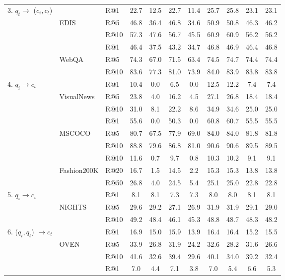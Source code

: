 \begin{table}[]
{\begin{tabular}{lll|cccc|cccc}
 \midrule
\multirow{6}{*}{3. $q_t 	\to$ ($c_i, c_t$)} &  & R@1 & 22.7 & 12.5 & 22.7 & 11.4 & 25.7 & 25.8 & 23.1 & 23.1\\
 & EDIS & R@5 & 46.8 & 36.4 & 46.8 & 34.6 & 50.9 & 50.8 & 46.3 & 46.2\\
 &  & R@10 & 57.3 & 47.6 & 56.7 & 45.5 & 60.9 & 60.9 & 56.2 & 56.2\\
 \cmidrule{2-11}
 &  & R@1 & 46.4 & 37.5 & 43.2 & 34.7 & 46.8 & 46.9 & 46.4 & 46.8\\
 & WebQA & R@5 & 74.3 & 67.0 & 71.5 & 63.4 & 74.5 & 74.7 & 74.4 & 74.4\\
 &  & R@10 & 83.6 & 77.3 & 81.0 & 73.9 & 84.0 & 83.9 & 83.8 & 83.8\\
 \midrule
\multirow{9}{*}{4. $q_i 	\to c_t$} &  & R@1 & 10.4 & 0.0 & 6.5 & 0.0 & 12.5 & 12.2 & 7.4 & 7.4\\
 & VisualNews & R@5 & 23.8 & 4.0 & 16.2 & 4.5 & 27.1 & 26.8 & 18.4 & 18.4\\
 &  & R@10 & 31.0 & 8.1 & 22.2 & 8.6 & 34.9 & 34.6 & 25.0 & 25.0\\
 \cmidrule{2-11}
 &  & R@1 & 55.6 & 0.0 & 50.3 & 0.0 & 60.8 & 60.7 & 55.5 & 55.5\\
 & MSCOCO & R@5 & 80.7 & 67.5 & 77.9 & 69.0 & 84.0 & 84.0 & 81.8 & 81.8\\
 &  & R@10 & 88.8 & 79.6 & 86.8 & 81.0 & 90.6 & 90.6 & 89.5 & 89.5\\
 \cmidrule{2-11}
 &  & R@10 & 11.6 & 0.7 & 9.7 & 0.8 & 10.3 & 10.2 & 9.1 & 9.1\\
 & Fashion200K & R@20 & 16.7 & 1.5 & 14.5 & 2.2 & 15.3 & 15.3 & 13.8 & 13.8\\
 &  & R@50 & 26.8 & 4.0 & 24.5 & 5.4 & 25.1 & 25.0 & 22.8 & 22.8\\
 \midrule
\multirow{3}{*}{5. $q_i 	\to c_i$} &  & R@1 & 8.1 & 8.1 & 7.3 & 7.3 & 8.0 & 8.0 & 8.1 & 8.1\\
 & NIGHTS & R@5 & 29.6 & 29.2 & 27.1 & 26.9 & 31.9 & 31.9 & 29.1 & 29.0\\
 &  & R@10 & 49.2 & 48.4 & 46.1 & 45.3 & 48.8 & 48.7 & 48.3 & 48.2\\
 \midrule
\multirow{6}{*}{6. ($q_i, q_t$) $	\to c_t$} &  & R@1 & 16.9 & 15.0 & 15.9 & 13.9 & 16.4 & 16.4 & 15.2 & 15.5\\
 & OVEN & R@5 & 33.9 & 26.8 & 31.9 & 24.2 & 32.6 & 28.2 & 31.6 & 26.6\\
 &  & R@10 & 41.6 & 32.6 & 39.4 & 29.6 & 40.1 & 34.0 & 39.2 & 32.4\\
 \cmidrule{2-11}
 &  & R@1 & 7.0 & 4.4 & 7.1 & 3.8 & 7.0 & 5.4 & 6.6 & 5.3\\

\end{tabular}}
\end{table}
